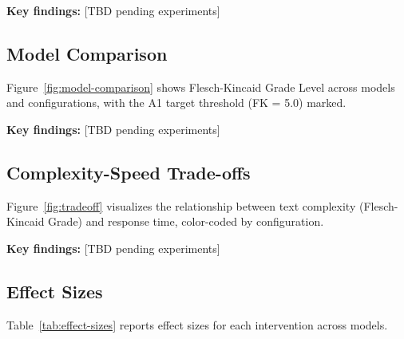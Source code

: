 \documentclass[10pt, a4paper]{article}
\begin{document}
\textbf{Key findings:} [TBD pending experiments]

\subsection{Model Comparison}

Figure~\ref{fig:model-comparison} shows Flesch-Kincaid Grade Level across models and configurations, with the A1 target threshold (FK = 5.0) marked.


\textbf{Key findings:} [TBD pending experiments]

\subsection{Complexity-Speed Trade-offs}

Figure~\ref{fig:tradeoff} visualizes the relationship between text complexity (Flesch-Kincaid Grade) and response time, color-coded by configuration.


\textbf{Key findings:} [TBD pending experiments]

\subsection{Effect Sizes}

Table~\ref{tab:effect-sizes} reports effect sizes for each intervention across models.
\end{document}
